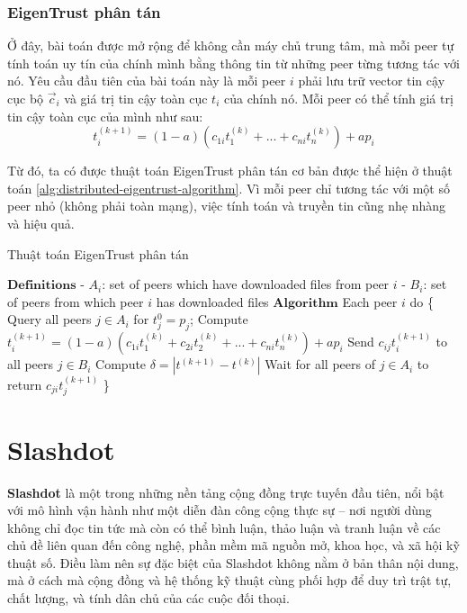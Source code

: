\subsubsection{EigenTrust phân tán}

Ở đây, bài toán được mở rộng để không cần máy chủ trung tâm, mà mỗi peer tự tính toán uy tín của chính mình bằng thông tin từ những peer từng tương tác với nó.
Yêu cầu đầu tiên của bài toán này là mỗi peer $i$ phải lưu trữ vector tin cậy cục bộ $\vec{c}_i$ và giá trị tin cậy toàn cục $t_i$ của chính nó.
Mỗi peer có thể tính giá trị tin cậy toàn cục của mình như sau:
\[t_i^{(k+1)} = (1 - a)(c_{1i}t_1^{(k)} + ... + c_{ni}t_n^{(k)}) + ap_i\]

Từ đó, ta có được thuật toán EigenTrust phân tán cơ bản được thể hiện ở thuật toán \ref{alg:distributed-eigentrust-algorithm}.
Vì mỗi peer chỉ tương tác với một số peer nhỏ (không phải toàn mạng), việc tính toán và truyền tin cũng nhẹ nhàng và hiệu quả.

\begin{algorithm}
  \caption{Thuật toán EigenTrust phân tán}
  \label{alg:distributed-eigentrust-algorithm}
  \begin{algorithmic}
    \small
    \State $\textbf{Definitions}$
    \State \hspace{1em}- $A_i$: set of peers which have downloaded files from peer $i$
    \State \hspace{1em}- $B_i$: set of peers from which peer $i$ has downloaded files
    \State $\textbf{Algorithm}$
    \State Each peer $i$ do \{
    \State Query all peers $j \in A_i$ for $t_j^{0} = p_j$;
    \Repeat
    \State Compute $t_i^{(k+1)} = (1 - a)(c_{1i}t_1^{(k)} + c_{2i}t_2^{(k)} + ... + c_{ni}t_n^{(k)}) + ap_i$
    \State Send $c_{ij}t_i^{(k+1)}$ to all peers $j \in B_i$
    \State Compute $\delta = | t^{(k+1)} - t^{(k)} |$
    \State Wait for all peers of $j \in A_i$ to return $c_{ji}t_j^{(k+1)}$
    \Until{$\delta < \epsilon$}
    \State \}
  \end{algorithmic}
\end{algorithm}

\section{Slashdot}

\textbf{Slashdot} \cite{slashdot-web} là một trong những nền tảng cộng đồng trực tuyến đầu tiên, nổi bật với mô hình vận hành như một diễn đàn công cộng thực sự -- nơi người dùng không chỉ đọc tin tức mà còn có thể bình luận,
thảo luận và tranh luận về các chủ đề liên quan đến công nghệ, phần mềm mã nguồn mở, khoa học, và xã hội kỹ thuật số.
Điều làm nên sự đặc biệt của Slashdot không nằm ở bản thân nội dung, mà ở cách mà cộng đồng và hệ thống kỹ thuật cùng phối hợp để duy trì trật tự, chất lượng, và tính dân chủ của các cuộc đối thoại.

